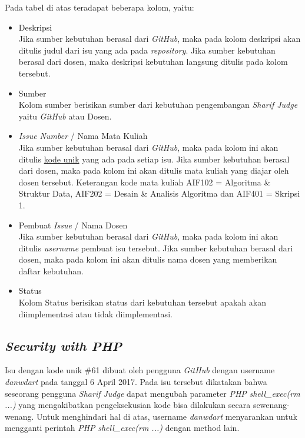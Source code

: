 Pada tabel di atas teradapat beberapa kolom, yaitu:
\begin{itemize}
	\item Deskripsi \\
	Jika sumber kebutuhan berasal dari \textit{GitHub}, maka pada kolom deskripsi akan ditulis judul dari isu yang ada pada \textit{repository}. Jika sumber kebutuhan berasal dari dosen, maka deskripsi kebutuhan langsung ditulis pada kolom tersebut.
	\item Sumber \\
	Kolom sumber berisikan sumber dari kebutuhan pengembangan \textit{Sharif Judge} yaitu \textit{GitHub} atau Dosen.
	\item \textit{Issue Number} / Nama Mata Kuliah \\
	Jika sumber kebutuhan berasal dari \textit{GitHub}, maka pada kolom ini akan ditulis \hyperref[sec:analisis]{kode unik} yang ada pada setiap isu. Jika sumber kebutuhan berasal dari dosen, maka pada kolom ini akan ditulis mata kuliah yang diajar oleh dosen tersebut. Keterangan kode mata kuliah AIF102 = Algoritma \& Struktur Data, AIF202 = Desain \& Analisis Algoritma dan AIF401 = Skripsi 1.
	\item Pembuat \textit{Issue} / Nama Dosen \\
	Jika sumber kebutuhan berasal dari \textit{GitHub}, maka pada kolom ini akan ditulis \textit{username} pembuat isu tersebut. Jika sumber kebutuhan berasal dari dosen, maka pada kolom ini akan ditulis nama dosen yang memberikan daftar kebutuhan.
	\item Status \\
	Kolom Status berisikan status dari kebutuhan tersebut apakah akan diimplementasi atau tidak diimplementasi.
\end{itemize}


\subsection{\textit{Security with PHP}}
Isu dengan kode unik \#61 dibuat oleh pengguna \textit{GitHub} dengan username \textit{danwdart} pada tanggal 6 April 2017. Pada isu tersebut dikatakan bahwa seseorang pengguna \textit{Sharif Judge} dapat mengubah parameter \textit{PHP} \textit{shell\_exec(rm ...)} yang mengakibatkan pengeksekusian kode bisa dilakukan secara sewenang-wenang. Untuk menghindari hal di atas, username \textit{danwdart} menyarankan untuk mengganti perintah \textit{PHP} \textit{shell\_exec(rm ...)} dengan method lain.

